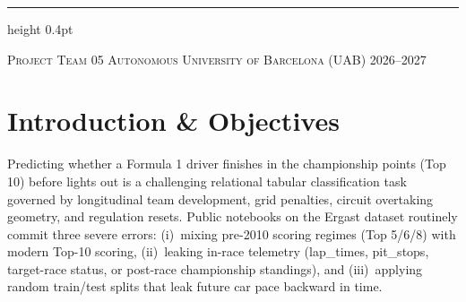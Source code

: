 \documentclass[10pt,a4paper,twocolumn]{article}
\newcommand{\code}[1]{{\fontsize{8.5pt}{10pt}\selectfont\ttfamily #1}}
\newcommand{\ub}{\_\allowbreak{}}
\begin{document}
\begin{titlepage}
  \vspace{0.8cm}
  {\color{rulelight}\hrule height 0.4pt}
  \vspace{6pt}
  {\footnotesize\scshape\color{muted} Project Team 05 \hfill Autonomous University of Barcelona (UAB) \hfill 2026--2027}
  \vspace*{0.2cm}
\end{titlepage}

\setcounter{page}{1}
\thispagestyle{bodyfirst}


\section{Introduction \& Objectives}

Predicting whether a Formula 1 driver finishes in the championship points (Top 10) before lights out is a challenging relational tabular classification task governed by longitudinal team development, grid penalties, circuit overtaking geometry, and regulation resets. Public notebooks on the Ergast dataset routinely commit three severe errors: (i)~mixing pre-2010 scoring regimes (Top 5/6/8) with modern Top-10 scoring, (ii)~leaking in-race telemetry (\code{lap\ub times}, \code{pit\ub stops}, target-race \code{status}, or post-race championship standings), and (iii)~applying random train/test splits that leak future car pace backward in time.
\end{document}
